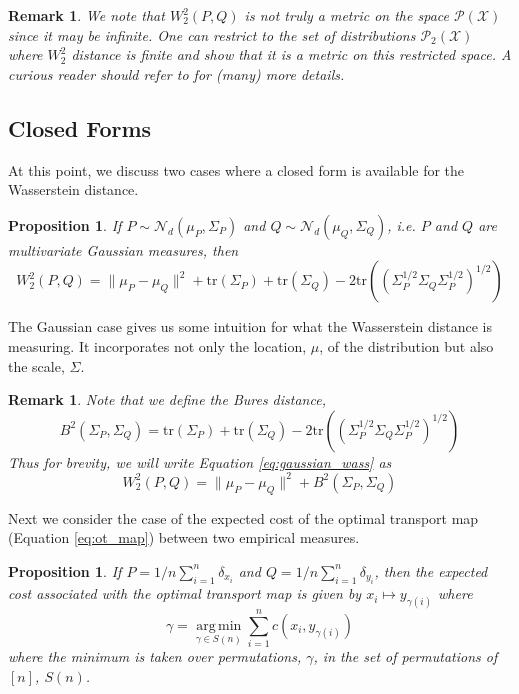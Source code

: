 \documentclass[11pt, a4paper, fleqn]{article}
\numberwithin{equation}{section}
\numberwithin{figure}{section}
\numberwithin{table}{section}
\newtheorem{prop}[thm]{Proposition}
\newtheorem{rem}[thm]{Remark}
\DeclareMathOperator*{\argmin}{arg\,min}
\begin{document}
\begin{rem}
We note that $W_2^2(P, Q)$ is not truly a metric on the space $\mathcal{P}(\mathcal{X})$ since it may be infinite. One can restrict to the set of distributions $\mathcal{P}_2(\mathcal{X})$ where $W_2^2$ distance is finite and show that it is a metric on this restricted space. A curious reader should refer to \cite{villani2008optimal} for (many) more details.
\end{rem}

\subsection{Closed Forms}
At this point, we discuss two cases where a closed form is available for the Wasserstein distance.

\begin{prop}
If $P \sim \mathcal{N}_d(\mu_P, \Sigma_P)$ and $Q \sim \mathcal{N}_d(\mu_Q, \Sigma_Q)$, i.e. $P$ and $Q$ are multivariate Gaussian measures, then
\begin{equation}\label{eq:gaussian_wass}
W_2^2(P, Q) = \|\mu_P - \mu_Q\|^2 + \mbox{tr}(\Sigma_P) + \mbox{tr}(\Sigma_Q) - 2\mbox{tr}((\Sigma_P^{1/2} \Sigma_Q \Sigma_P^{1/2})^{1/2})
\end{equation}
\end{prop}

The Gaussian case gives us some intuition for what the Wasserstein distance is measuring. It incorporates not only the location, $\mu$, of the distribution but also the scale, $\Sigma$. 

\begin{rem}
Note that we define the \textit{Bures distance},
\begin{equation}
B^2(\Sigma_P, \Sigma_Q) = \mbox{tr}(\Sigma_P) + \mbox{tr}(\Sigma_Q) - 2\mbox{tr}((\Sigma_P^{1/2} \Sigma_Q \Sigma_P^{1/2})^{1/2})
\end{equation}
Thus for brevity, we will write Equation \eqref{eq:gaussian_wass} as
\begin{equation}
W_2^2(P, Q) = \|\mu_P - \mu_Q\|^2 + B^2(\Sigma_P, \Sigma_Q)
\end{equation}
\end{rem}

Next we consider the case of the expected cost of the optimal transport map (Equation \eqref{eq:ot_map}) between two empirical measures.

\begin{prop}\label{prop:ot_map_empirical}
If $P = 1/n \sum_{i=1}^n \delta_{x_i}$ and $Q = 1/n \sum_{i=1}^n \delta_{y_i}$, then the expected cost associated with the optimal transport map is given by $x_i \mapsto y_{\gamma(i)}$ where
\begin{equation}\label{eq:ot_map_empirical}
\gamma = \argmin\limits_{\gamma \in S(n)} \sum\limits_{i=1}^n c(x_i, y_{\gamma(i)})
\end{equation}
where the minimum is taken over permutations, $\gamma$, in the set of permutations of $[n]$, $S(n)$.
\end{prop}
\end{document}
